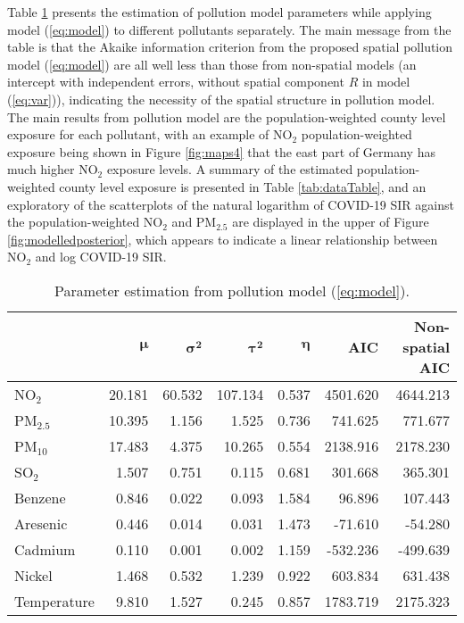 \documentclass[12,]{article}
\begin{document}
Table \ref{tab:polParameter} presents the estimation of pollution model
parameters while applying model (\ref{eq:model}) to different pollutants
separately. The main message from the table is that the Akaike
information criterion \autocite[AIC,][]{Akaike1973} from the proposed
spatial pollution model (\ref{eq:model}) are all well less than those
from non-spatial models (an intercept with independent errors, without
spatial component \(R\) in model (\ref{eq:var})), indicating the
necessity of the spatial structure in pollution model. The main results
from pollution model are the population-weighted county level exposure
for each pollutant, with an example of NO\(_2\) population-weighted
exposure being shown in Figure \ref{fig:maps4} that the east part of
Germany has much higher NO\(_2\) exposure levels. A summary of the
estimated population-weighted county level exposure is presented in
Table \ref{tab:dataTable}, and an exploratory of the scatterplots of the
natural logarithm of COVID-19 SIR against the population-weighted
NO\(_2\) and PM\(_{2.5}\) are displayed in the upper of Figure
\ref{fig:modelledposterior}, which appears to indicate a linear
relationship between NO\(_2\) and log COVID-19 SIR.

\begin{table}

\caption{\label{tab:polParameter}Parameter estimation from pollution model (\ref{eq:model}).}
\centering
\begin{tabular}[t]{lrrrrrr}
\toprule
\textbf{ } & \textbf{$\symbf{\mu}$} & \textbf{$\symbf{\sigma^2}$} & \textbf{$\symbf{\tau^2}$} & \textbf{$\symbf{\eta}$} & \textbf{AIC} & \textbf{Non-spatial AIC}\\
\midrule
NO$_2$ & 20.181 & 60.532 & 107.134 & 0.537 & 4501.620 & 4644.213\\
PM$_{2.5}$ & 10.395 & 1.156 & 1.525 & 0.736 & 741.625 & 771.677\\
PM$_{10}$ & 17.483 & 4.375 & 10.265 & 0.554 & 2138.916 & 2178.230\\
SO$_2$ & 1.507 & 0.751 & 0.115 & 0.681 & 301.668 & 365.301\\
Benzene & 0.846 & 0.022 & 0.093 & 1.584 & 96.896 & 107.443\\
Aresenic & 0.446 & 0.014 & 0.031 & 1.473 & -71.610 & -54.280\\
Cadmium & 0.110 & 0.001 & 0.002 & 1.159 & -532.236 & -499.639\\
Nickel & 1.468 & 0.532 & 1.239 & 0.922 & 603.834 & 631.438\\
Temperature & 9.810 & 1.527 & 0.245 & 0.857 & 1783.719 & 2175.323\\
\bottomrule
\end{tabular}
\end{table}
\end{document}
